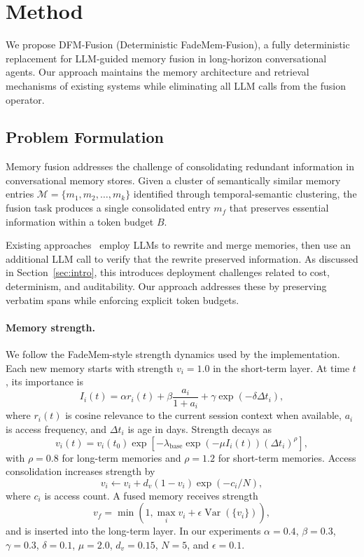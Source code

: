 \section{Method}
\label{sec:method}

We propose DFM-Fusion (Deterministic FadeMem-Fusion), a fully deterministic replacement for LLM-guided memory fusion in long-horizon conversational agents. Our approach maintains the memory architecture and retrieval mechanisms of existing systems while eliminating all LLM calls from the fusion operator.

\subsection{Problem Formulation}

Memory fusion addresses the challenge of consolidating redundant information in conversational memory stores. Given a cluster of semantically similar memory entries $\mathcal{M} = \{m_1, m_2, \ldots, m_k\}$ identified through temporal-semantic clustering, the fusion task produces a single consolidated entry $m_f$ that preserves essential information within a token budget $B$.

Existing approaches~\citep{Wei2026FadeMemBF,chhikara2025mem0buildingproductionreadyai} employ LLMs to rewrite and merge memories, then use an additional LLM call to verify that the rewrite preserved information. As discussed in Section~\ref{sec:intro}, this introduces deployment challenges related to cost, determinism, and auditability. Our approach addresses these by preserving verbatim spans while enforcing explicit token budgets.

\paragraph{Memory strength.}
We follow the FadeMem-style strength dynamics used by the implementation. Each new memory starts with strength $v_i=1.0$ in the short-term layer. At time $t$, its importance is
\begin{equation}
I_i(t)=\alpha r_i(t)+\beta \frac{a_i}{1+a_i}+\gamma \exp(-\delta \Delta t_i),
\end{equation}
where $r_i(t)$ is cosine relevance to the current session context when available, $a_i$ is access frequency, and $\Delta t_i$ is age in days. Strength decays as
\begin{equation}
v_i(t)=v_i(t_0)\exp\left[-\lambda_\text{base}\exp(-\mu I_i(t))(\Delta t_i)^{\rho}\right],
\end{equation}
with $\rho=0.8$ for long-term memories and $\rho=1.2$ for short-term memories. Access consolidation increases strength by
\begin{equation}
v_i \leftarrow v_i + d_v(1-v_i)\exp(-c_i/N),
\end{equation}
where $c_i$ is access count. A fused memory receives strength
\begin{equation}
v_f=\min\left(1,\max_i v_i+\epsilon \operatorname{Var}(\{v_i\})\right),
\end{equation}
and is inserted into the long-term layer. In our experiments $\alpha=0.4$, $\beta=0.3$, $\gamma=0.3$, $\delta=0.1$, $\mu=2.0$, $d_v=0.15$, $N=5$, and $\epsilon=0.1$.

